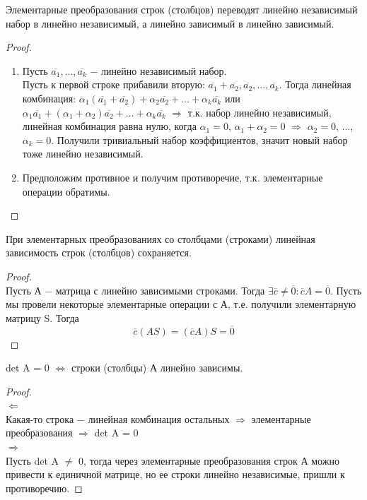 \begin{theorem}
    Элементарные преобразования строк (столбцов) переводят линейно независимый набор в линейно независимый, а линейно зависимый в линейно зависимый.
\end{theorem}
\begin{proof}
    \tab\\
    \begin{enumerate}
        \item Пусть $\overline{a_1}, ..., \overline{a_k}$ $-$ линейно независимый набор.\\
        Пусть к первой строке прибавили вторую: $\overline{a_1} + \overline{a_2}, \overline{a_2}, ..., \overline{a_k}$. Тогда линейная комбинация: $\alpha_1(\overline{a_1} + \overline{a_2}) +  \alpha_2\overline{a_2} + ... + \alpha_k\overline{a_k}$ или $\alpha_1\overline{a_1}  +  (\alpha_1 + \alpha_2)\overline{a_2} + ... + \alpha_k\overline{a_k}$ $\Longrightarrow$ т.к. набор линейно независимый, линейная комбинация равна нулю, когда $\alpha_1 = 0$, $\alpha_1 + \alpha_2 = 0$ $\Longrightarrow$ $\alpha_2 = 0$, ..., $\alpha_k = 0$. Получили тривиальный набор коэффициентов, значит новый набор тоже линейно независимый.
        \item Предположим противное и получим противоречие, т.к. элементарные операции обратимы.
    \end{enumerate}
\end{proof}

\begin{theorem}
    При элементарных преобразованиях со столбцами (строками) линейная зависимость строк (столбцов) сохраняется.
\end{theorem}
\begin{proof}
    \tab\\
    Пусть А $-$ матрица с линейно зависимыми строками. Тогда $\exists \overline{c}\neq\overline{0} : \overline{c}A = \overline{0}$. Пусть мы провели некоторые элементарные операции с А, т.е. получили элементарную матрицу S. Тогда
    \[
    \overline{c}(AS) = (\overline{c}A)S = \overline{0}
    \]
\end{proof}

\begin{theorem}
    det A = 0 $\Longleftrightarrow$ строки (столбцы) А линейно зависимы.
\end{theorem}
\begin{proof}
    \tab\\
    $\Longleftarrow$\\
    Какая-то строка $-$ линейная комбинация остальных $\Longrightarrow$ элементарные преобразования $\Longrightarrow$ det A = 0\\

    $\Longrightarrow$\\
    Пусть det A $\neq$ 0, тогда через элементарные преобразования строк А можно привести к единичной матрице, но ее строки линейно независимые, пришли к противоречию.
\end{proof}

